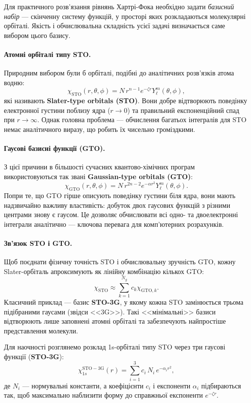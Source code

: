 Для практичного розв'язання рівнянь Хартрі-Фока необхідно задати
\emph{базисний набір} --- скінченну систему функцій, у просторі яких
розкладаються молекулярні орбіталі.
Якість і обчислювальна складність усієї задачі визначається саме вибором цього базису.

\paragraph{Атомні орбіталі типу STO.}
Природним вибором були б орбіталі, подібні до аналітичних розв'язків атома водню:
\[
	\chi_{\mathrm{STO}}(r,\theta,\phi) = N\,r^{n-1}e^{-\zeta r}Y_\ell^m(\theta,\phi),
\]
які називають \textbf{Slater-type orbitals (STO)}.
Вони добре відтворюють поведінку електронної густини поблизу ядра ($r\to0$)
та правильний експоненційний спад при $r\to\infty$.
Однак головна проблема --- обчислення багатьох інтегралів для STO немає
аналітичного виразу, що робить їх чисельно громіздкими.

\paragraph{Гаусові базисні функції (GTO).}
З цієї причини в більшості сучасних квантово-хімічних програм
використовуються так звані \textbf{Gaussian-type or\-bi\-tals (GTO)}:
\[
	\chi_{\mathrm{GTO}}(r,\theta,\phi) = N\,r^{2n-2}e^{-\alpha r^2}Y_\ell^m(\theta,\phi).
\]
Попри те, що GTO гірше описують поведінку густини біля ядра,
вони мають надзвичайно важливу властивість:
добуток двох гаусових функцій з різними центрами
знову є гаусом. Це дозволяє обчислювати всі одно- та двоелектронні інтеграли
аналітично --- ключова перевага для комп’ютерних розрахунків.

\paragraph{Зв’язок STO і GTO.}
Щоб поєднати фізичну точність STO і обчислювальну зручність GTO,
кожну Slater-орбіталь апроксимують як лінійну комбінацію кількох GTO:
\[
	\chi_{\mathrm{STO}} \approx \sum_{k=1}^{N_g} c_k \chi_{\mathrm{GTO},k}.
\]
Класичний приклад --- базис \textbf{STO-3G}, у якому кожна STO
замінюється трьома підібраними гаусами (звідси <<3G>>).
Такі <<мінімальні>> базиси відтворюють лише заповнені атомні орбіталі
та забезпечують найпростіше представлення молекули.

Для наочності розглянемо розклад 1s-орбіталі типу STO
через три гаусові функції (\textbf{STO-3G}):
\[
	\chi_{1s}^{\mathrm{STO-3G}}(r) =
	\sum_{i=1}^{3} c_i\, N_i\, e^{-\alpha_i r^2},
\]
де $N_i$ --- нормувальні константи, а коефіцієнти $c_i$ і експоненти $\alpha_i$
підбираються так, щоб максимально наблизити форму до справжньої експоненти $e^{-\zeta r}$.

